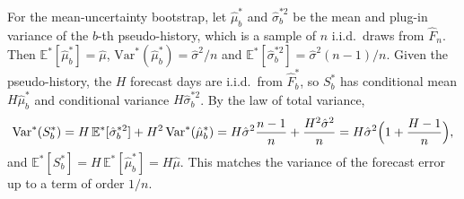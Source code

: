 \documentclass{article}
\newcommand{\E}{\mathbb{E}}
\newcommand{\muhat}{\hat\mu}
\begin{document}
For the mean-uncertainty bootstrap, let $\muhat^*_b$ and $\hat\sigma^{*2}_b$ be the mean and plug-in
variance of the $b$-th pseudo-history, which is a sample of $n$ i.i.d.\ draws from $\hat F_n$. Then
$\E^*[\muhat^*_b]=\muhat$, $\mathrm{Var}^*(\muhat^*_b)=\hat\sigma^2/n$ and
$\E^*[\hat\sigma^{*2}_b]=\hat\sigma^2(n-1)/n$. Given the pseudo-history, the $H$ forecast days are
i.i.d.\ from $\hat F^*_b$, so $S^*_b$ has conditional mean $H\muhat^*_b$ and conditional variance
$H\hat\sigma^{*2}_b$. By the law of total variance,
\[
  \mathrm{Var}^*(S^*_b)=H\,\E^*[\hat\sigma^{*2}_b]+H^2\,\mathrm{Var}^*(\muhat^*_b)
  =H\hat\sigma^2\frac{n-1}{n}+\frac{H^2\hat\sigma^2}{n}
  =H\hat\sigma^2\Bigl(1+\frac{H-1}{n}\Bigr),
\]
and $\E^*[S^*_b]=H\,\E^*[\muhat^*_b]=H\muhat$. This matches the variance of the forecast error up to
a term of order $1/n$.
\end{document}
